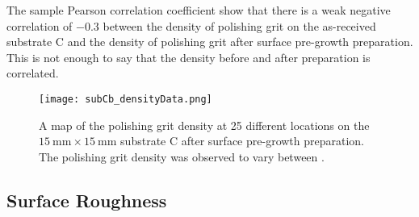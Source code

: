  The sample Pearson correlation coefficient show that there is a weak negative correlation of \SI{-0.3}{} between the density of polishing grit on the as-received substrate C and the density of polishing grit after surface pre-growth preparation. This is not enough to say that the density before and after preparation is correlated.

\begin{figure}[htbp]
    \centering
    \texttt{[image: subCb\_densityData.png]}
    \caption[Map of the polishing grit density on substrate C after surface pre-growth preparation.]{A map of the polishing grit density at 25 different locations on the $\SI{15}{\milli\metre}\times\SI{15}{\milli\metre}$ substrate C after surface pre-growth preparation. The polishing grit density was observed to vary between .}
    \label{fig:subCb_densityData}
\end{figure}


\subsection{Surface Roughness}


